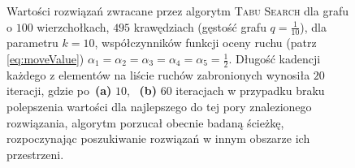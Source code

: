 \begin{figure}[!htbp]
\begin{subfigure}[b]{0.45\textwidth}
		\caption{}
		\label{fig:rrimst1:b}
	\end{subfigure}
	\hfill\null
	\caption{
		Wartości rozwiązań zwracane przez algorytm \textsc{Tabu Search} dla grafu o $100$ wierzchołkach, $495$ krawędziach (gęstość grafu $q = \frac{1}{10}$), dla parametru $k = 10$, współczynników funkcji oceny ruchu (patrz \ref{eq:moveValue}) $\alpha_{1} = \alpha_{2} = \alpha_{3} = \alpha_{4} = \alpha_{5} = \frac{1}{2}$. Długość kadencji każdego z elementów na liście ruchów zabronionych wynosiła $20$ iteracji, gdzie po~\textbf{(a)} $10$, ~\textbf{(b)} $60$ iteracjach w przypadku braku polepszenia wartości dla najlepszego do tej pory znalezionego rozwiązania, algorytm porzucał obecnie badaną ścieżkę, rozpoczynając poszukiwanie rozwiązań w innym obszarze ich przestrzeni.
	}
\end{figure}


